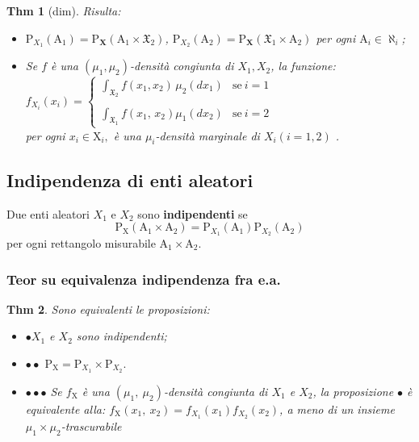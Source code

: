 \documentclass[a4paper,11pt]{article}
\theoremstyle{plain}
\newtheorem{thm}{Thm}[section]
\theoremstyle{definition}
\theoremstyle{remark}
\begin{document}
\begin{thm} [dim] Risulta:
\begin{itemize}
\item[$\bullet $]  $\mathrm{P}_{X_{1}}(\mathrm{A}_{1})=\mathrm{P}_{\textbf{X}}(\mathrm{A}_{1}\times \mathfrak{X}_{2})$, $\mathrm{P}_{X_{2}}(\mathrm{A}_{2})=\mathrm{P}_{\textbf{X}}(\mathfrak{X}_{1}\times \mathrm{A}_{2})$ per ogni $\mathrm{A}_{i}\in\aleph_{i}$; 
\item[$\bullet \bullet$] 
Se $f$ \`{e} una $(\mu_{1}, \mu_{2})$-densit\`{a} congiunta di $X_{1}, X_{2}$, la funzione:\\
$ f_{X_{i}}(x_{i})=\left\{\begin{array}{ll}
\displaystyle \int_{\mathfrak{X}_{2}}f(x_{1}, x_{2}) \, \mu_{2}(dx_1) & \mathrm{s}\mathrm{e}\ i=1\\
\\
\displaystyle \int_{\mathfrak{X}_{1}}f(x_{1}, \, x_{2})\mu_{1}(dx_2) & \mathrm{s}\mathrm{e}\ i=2
\end{array}\right.$\\ 
per ogni $x_{i}\in \mathrm{X}_{i},$ \`{e} una $\mu_{i}$-densit\`{a} marginale di $X_{i}(i=1,2)$ .
\end{itemize}
\end{thm}


\subsection{Indipendenza di enti aleatori}
Due enti aleatori $X_{1}$ e $X_{2}$ sono \textbf{indipendenti} se
$$
\mathrm{P}_{\mathrm{X}}(\mathrm{A}_{1}\times \mathrm{A}_{2})=\mathrm{P}_{X_{1}}(\mathrm{A}_{1})\mathrm{P}_{X_{2}}(\mathrm{A}_{2})
$$
per ogni rettangolo misurabile $\mathrm{A}_{1}\times \mathrm{A}_{2}.$

\subsubsection{Teor su  equivalenza  indipendenza fra e.a.}
\begin{thm}
Sono equivalenti le proposizioni:
\begin{itemize}
\item[]$\bullet X_{1}$ e $X_{2}$ sono indipendenti;
\item[] $\bullet\bullet$ $\mathrm{P}_{\mathrm{X}}=\mathrm{P}_{X_{1}}\times \mathrm{P}_{X_{2}}.$
\item[] $\bullet \bullet \bullet$ Se $f_{\mathrm{X}}$ \`{e} una $(\mu_{1},\ \mu_{2})$-densit\`{a} congiunta di $X_{1}$ e $X_{2}$, la proposizione $\bullet$ \`{e} equivalente alla: $f_{\mathrm{X}}(x_{1},\ x_{2})=f_{X_{1}}(x_{1})f_{X_{2}}(x_{2})$, a meno di un insieme $\mu_{1}\times\mu_{2}$-trascurabile
\end{itemize}
\end{thm}
\end{document}
